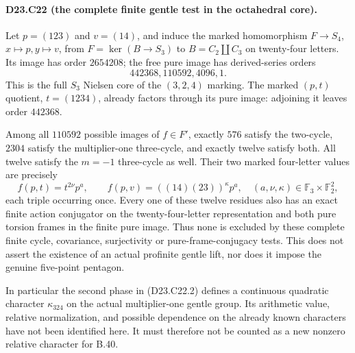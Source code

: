 \paragraph{D23.C22 (the complete finite gentle test in the octahedral core).}
Let $p=(123)$ and $v=(14)$, and induce the marked homomorphism
$F\to S_4$, $x\mapsto p,y\mapsto v$, from
$F=\ker(B\to S_3)$ to $B=C_2\amalg C_3$ on twenty-four
letters. Its image has order $2654208$; the free pure image
has derived-series orders
\[
                         442368,110592,4096,1.
\tag{D23.C22.1}
\]
This is the full $S_3$ Nielsen core of the $(3,2,4)$ marking.
The marked $(p,t)$ quotient, $t=(1234)$, already factors
through its pure image: adjoining it leaves order $442368$.

Among all $110592$ possible images of $f\in F'$,
exactly $576$ satisfy the two-cycle, $2304$ satisfy the
multiplier-one three-cycle, and exactly twelve satisfy both.
All twelve satisfy the $m=-1$ three-cycle as well.
Their two marked four-letter values are precisely
\[
 f(p,t)=t^{2\nu}p^a,\qquad
 f(p,v)=((14)(23))^\kappa p^a,
 \quad (a,\nu,\kappa)\in\mathbb F_3\times\mathbb F_2^2,
\tag{D23.C22.2}
\]
each triple occurring once. Every one of these twelve
residues also has an exact finite action conjugator on the
twenty-four-letter representation and both pure torsion
frames in the finite pure image. Thus none is excluded by
these complete finite cycle, covariance, surjectivity or
pure-frame-conjugacy tests. This does not assert the
existence of an actual profinite gentle lift, nor does it
impose the genuine five-point pentagon.

In particular the second phase in (D23.C22.2) defines a
continuous quadratic character $\kappa_{324}$ on the actual
multiplier-one gentle group. Its arithmetic value, relative
normalization, and possible dependence on the already known
characters have not been identified here. It must therefore
not be counted as a new nonzero relative character for B.40.

